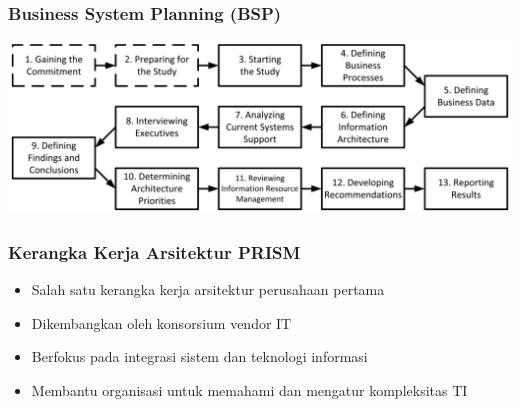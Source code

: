 \documentclass{beamer}
\begin{document}
	{
		\begin{frame}
			\frametitle{Business System Planning (BSP)}
			\begin{center}
				\includegraphics[width=\textwidth]{../figures/bsp}
			\end{center}
		\end{frame}
	}

	\begin{frame}
		\frametitle{Kerangka Kerja Arsitektur PRISM}
		\begin{itemize}
			\item Salah satu kerangka kerja arsitektur perusahaan pertama
			\item Dikembangkan oleh konsorsium vendor IT
			\item Berfokus pada integrasi sistem dan teknologi informasi
			\item Membantu organisasi untuk memahami dan mengatur kompleksitas TI
		\end{itemize}
	\end{frame}
	
\end{document}
